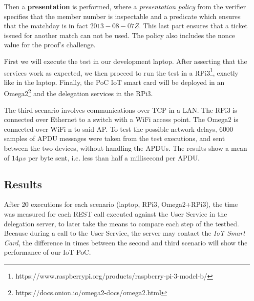 Then a \textbf{presentation} is performed, where a \textit{presentation policy} from the verifier specifies that the member number is inspectable and a predicate which ensures that the matchday is in fact $2013-08-07Z$. This last part ensures that a ticket issued for another match can not be used. The policy also includes the nonce value for the proof's challenge.

\hfil


First we will execute the test in our development laptop. After asserting that the services work as expected, we then proceed to run the test in a RPi3\footnote{{https://www.raspberrypi.org/products/raspberry-pi-3-model-b/}}, exactly like in the laptop. Finally, the PoC IoT smart card will be deployed in an Omega2\footnote{{https://docs.onion.io/omega2-docs/omega2.html}} and the delegation services in the RPi3.

\hfil

The third scenario involves communications over TCP in a LAN. The RPi3 is connected over Ethernet to a switch with a WiFi access point. The Omega2 is connected over WiFi n to said AP. To test the possible network delays, $6000$ samples of APDU messages were taken from the test executions, and sent between the two devices, without handling the APDUs. The results show a mean of $14\mu s$ per byte sent, i.e. less than half a millisecond per APDU.



\subsection{Results}

After 20 executions for each scenario (laptop, RPi3, Omega2+RPi3), the time was measured for each REST call executed against the User Service in the delegation server, to later take the means to compare each step of the testbed. Because during a call to the User Service, the server may contact the \textit{IoT Smart Card}, the difference in times between the second and third scenario will show the performance of our IoT PoC.

